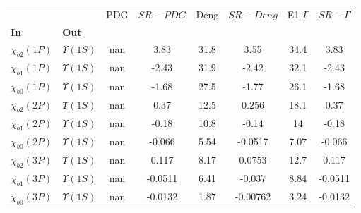 \begin{tabular}{l|l|c|c|c|c|c|c}
\toprule
                &                &  PDG & $SR-PDG$ &  Deng & $SR-Deng$ &  E1-$\Gamma$ & $SR-\Gamma$ \\
\textbf{In} & \textbf{Out} &      &          &       &           &              &             \\
\midrule
\textbf{$\chi_{b2}(1P)$} & \textbf{$\Upsilon(1S)$} &  nan &     3.83 &  31.8 &      3.55 &         34.4 &        3.83 \\
\textbf{$\chi_{b1}(1P)$} & \textbf{$\Upsilon(1S)$} &  nan &    -2.43 &  31.9 &     -2.42 &         32.1 &       -2.43 \\
\textbf{$\chi_{b0}(1P)$} & \textbf{$\Upsilon(1S)$} &  nan &    -1.68 &  27.5 &     -1.77 &         26.1 &       -1.68 \\
\textbf{$\chi_{b2}(2P)$} & \textbf{$\Upsilon(1S)$} &  nan &     0.37 &  12.5 &     0.256 &         18.1 &        0.37 \\
\textbf{$\chi_{b1}(2P)$} & \textbf{$\Upsilon(1S)$} &  nan &    -0.18 &  10.8 &     -0.14 &           14 &       -0.18 \\
\textbf{$\chi_{b0}(2P)$} & \textbf{$\Upsilon(1S)$} &  nan &   -0.066 &  5.54 &   -0.0517 &         7.07 &      -0.066 \\
\textbf{$\chi_{b2}(3P)$} & \textbf{$\Upsilon(1S)$} &  nan &    0.117 &  8.17 &    0.0753 &         12.7 &       0.117 \\
\textbf{$\chi_{b1}(3P)$} & \textbf{$\Upsilon(1S)$} &  nan &  -0.0511 &  6.41 &    -0.037 &         8.84 &     -0.0511 \\
\textbf{$\chi_{b0}(3P)$} & \textbf{$\Upsilon(1S)$} &  nan &  -0.0132 &  1.87 &  -0.00762 &         3.24 &     -0.0132 \\
\bottomrule
\end{tabular}
